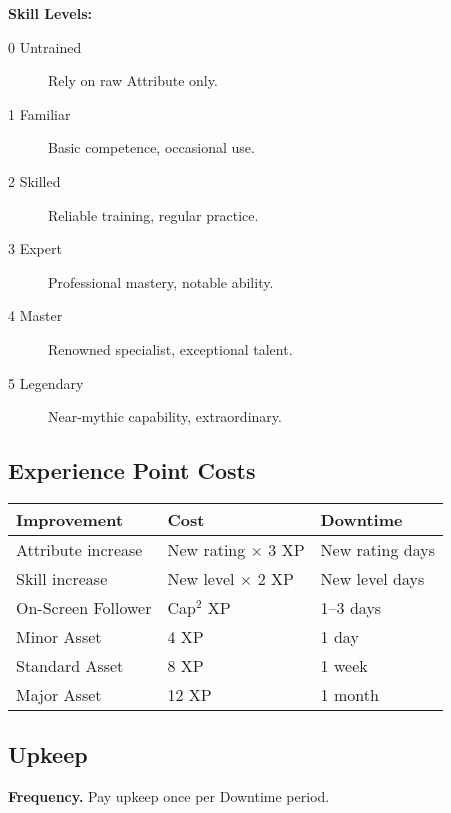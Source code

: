 \textbf{Skill Levels:}
\begin{description}
\item[0 Untrained] Rely on raw Attribute only.
\item[1 Familiar] Basic competence, occasional use.
\item[2 Skilled] Reliable training, regular practice.
\item[3 Expert] Professional mastery, notable ability.
\item[4 Master] Renowned specialist, exceptional talent.
\item[5 Legendary] Near-mythic capability, extraordinary.
\end{description}

\subsection{Experience Point Costs}
\label{subsec:xp-costs-ref}

\begin{center}
\feTableStart
\begin{tabularx}{\linewidth}{@{}l l l @{}}
\toprule
\textbf{Improvement} & \textbf{Cost} & \textbf{Downtime} \\
\midrule
Attribute increase & New rating $\times$ 3 XP & New rating days \\
Skill increase & New level $\times$ 2 XP & New level days \\
On-Screen Follower & Cap$^2$ XP & 1--3 days \\
Minor Asset & 4 XP & 1 day \\
Standard Asset & 8 XP & 1 week \\
Major Asset & 12 XP & 1 month \\
\bottomrule
\end{tabularx}
\feTableEnd
\end{center}


\subsection*{Upkeep}\label{sec:upkeep-srd}

\textbf{Frequency.} Pay upkeep once per Downtime period.

